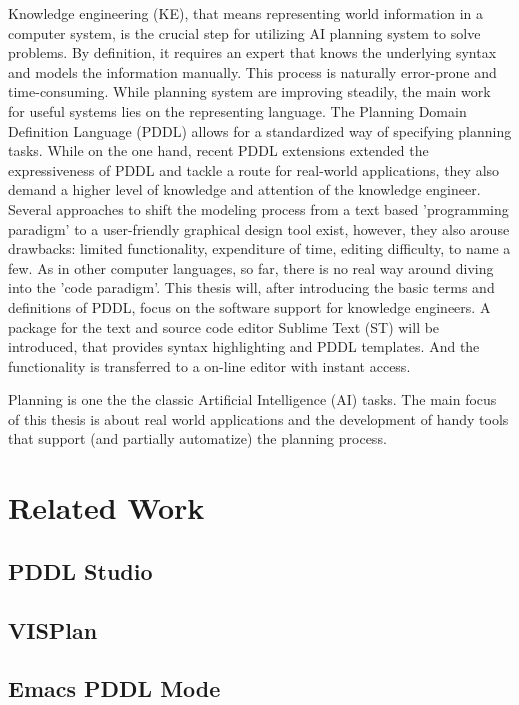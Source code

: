 \documentclass[11pt]{report}
\begin{document}
Knowledge engineering (KE), that means representing world information
in a computer system, is the crucial step for utilizing AI planning
system to solve problems. By definition, it requires an expert that
knows the underlying syntax and models the information manually. This
process is naturally error-prone and time-consuming. While planning
system are improving steadily, the main work for useful systems lies
on the representing language. The Planning Domain Definition Language
(PDDL) \parencite{mcdermott1998pddl} allows for a standardized way of
specifying planning tasks. While on the one hand, recent PDDL extensions
\parencite{fox2003pddl2,kovacs2011bnf} extended the expressiveness of
PDDL and tackle a route for real-world applications, they also demand
a higher level of knowledge and attention of the knowledge engineer.
Several approaches to shift the modeling process from a text based
'programming paradigm' to a user-friendly graphical design tool exist,
however, they also arouse drawbacks: limited functionality,
expenditure of time, editing difficulty, to name a few. As in other
computer languages, so far, there is no real way around diving into
the 'code paradigm'. 
This thesis will, after introducing the basic terms and definitions of
PDDL, focus on the software support for knowledge engineers. A package
for the text and source code editor Sublime Text (ST) will be
introduced, that provides syntax highlighting and PDDL templates. And
the functionality is transferred to a on-line editor with instant access. 

Planning is one the the classic Artificial Intelligence (AI) tasks.
The main focus of this thesis is about real world applications and the
development of handy tools that support (and partially automatize) the
planning process. 
\chapter{Related Work}
\label{sec-2}
\section{PDDL Studio}
\label{sec-2-1}
\section{VISPlan}
\label{sec-2-2}

\section{Emacs PDDL Mode}
\label{sec-2-3}
\end{document}
